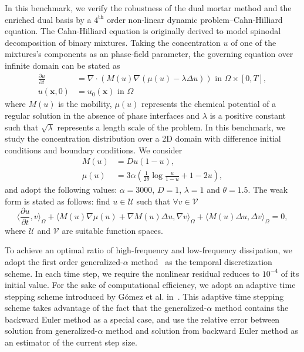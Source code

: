 In this benchmark, we verify the robustness of the dual mortar method and the enriched dual basis by a $4^\text{th}$ order non-linear dynamic problem--Cahn-Hilliard equation. The Cahn-Hilliard equation is originally derived to model spinodal decomposition of binary mixtures. Taking the concentration $u$ of one of the mixtures's components as an phase-field parameter, the governing equation over infinite domain can be stated as
\begin{equation}
	\begin{split}
		\frac{\partial u}{\partial t} &= \nabla \cdot \left( M(u) \nabla\left( \mu(u)-\lambda \Delta u \right) \right)\text{ in } \Omega\times\left[ 0,T \right],\\
		u(\mathbf{x}, 0 ) &= u_0(\mathbf{x}) \text{ in } \Omega
	\end{split}
\end{equation}
where $M(u)$ is the mobility, $\mu(u)$ represents the chemical potential of a regular solution in the absence of phase interfaces and $\lambda$ is a positive constant such that $\sqrt{\lambda}$ represents a length scale of the problem. In this benchmark, we study the concentration distribution over a 2D domain with difference initial conditions and boundary conditions. We consider
\begin{align}
	M(u)   & = Du(1-u),                                                     \\
	\mu(u) & = 3\alpha\left(\frac{1}{2\theta}\log\frac{u}{1-u}+1-2u\right),
\end{align}
and adopt the following values: $\alpha=3000$, $D=1$, $\lambda = 1$ and $\theta = 1.5$. The weak form is stated as follows: find $u\in \mathcal{U}$ such that $\forall v\in \mathcal{V}$
\begin{equation}
	\langle \frac{\partial u}{\partial t}, v\rangle_\Omega + \langle M(u)\nabla \mu(u)+\nabla M(u)\Delta u,\nabla v \rangle_\Omega+\langle M(u)\Delta u,\Delta v \rangle_\Omega = 0,
\end{equation}
where $\mathcal{U}$ and $\mathcal{V}$ are suitable function spaces. \par

To achieve an optimal ratio of high-frequency and low-frequency dissipation, we adopt the first order generalized-$\alpha$ method~\cite{chung1993time, jansen2000generalized} as the temporal discretization scheme. In each time step, we require the nonlinear residual reduces to $10^{-4}$ of its initial value. For the sake of computational efficiency, we adopt an adaptive time stepping scheme introduced by G\'omez et al. in~\cite{gomez2008isogeometric}. This adaptive time stepping scheme takes advantage of the fact that the generalized-$\alpha$ method contains the backward Euler method as a special case, and use the relative error between solution from generalized-$\alpha$ method and solution from backward Euler method as an estimator of the current step size. \par

